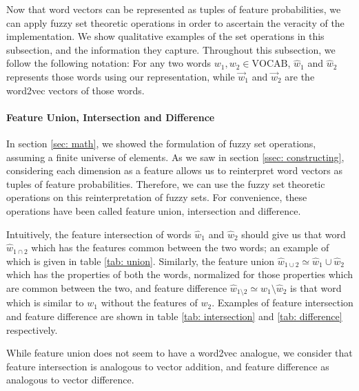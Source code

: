 \documentclass[11pt]{book}
\begin{document}
Now that word vectors can be represented as tuples of feature probabilities, we
can apply fuzzy set theoretic operations in order to ascertain the veracity of
the implementation. We show qualitative examples of the set operations in this
subsection, and the information they capture. Throughout this subsection, we
follow the following notation: For any two words $w_1, w_2 \in \text{VOCAB}$,
$\hat w_1$ and $\hat w_2$ represents those words using our representation,
while $\vec w_1$ and $\vec w_2$ are the word2vec vectors of those words.

\paragraph{Feature Union, Intersection and Difference} In section \ref{sec:
math}, we showed the formulation of fuzzy set operations, assuming a finite
universe of elements. As we saw in section \ref{ssec: constructing},
considering each dimension as a feature allows us to reinterpret word vectors
as tuples of feature probabilities. Therefore, we can use the fuzzy set
theoretic operations on this reinterpretation of fuzzy sets. For convenience,
these operations have been called feature union, intersection and difference.

Intuitively, the feature intersection of words $\hat w_1$ and $\hat w_2$ should
give us that word $\hat w_{1 \cap 2}$ which has the features common between the
two words; an example of which is given in table \ref{tab: union}. Similarly,
the feature union $\hat w_{1 \cup 2} \simeq \hat w_1 \cup \hat w_2$ which has
the properties of both the words, normalized for those properties which are
common between the two, and feature difference $\hat w_{1 \setminus 2} \simeq
\hat w_1 \setminus \hat w_2$ is that word which is similar to $w_1$ without the
features of $w_2$. Examples of feature intersection and feature difference are
shown in table \ref{tab: intersection} and \ref{tab: difference} respectively.

While feature union does not seem to have a word2vec analogue, we consider that
feature intersection is analogous to vector addition, and feature difference as
analogous to vector difference.
\end{document}

